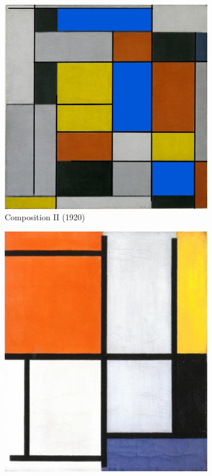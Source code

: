 \documentclass[serif,article,noparskip]{agse-thesis}
\begin{document}
\begin{figure}
\centering
\begin{subfigure}{.3\textwidth}
  \centering
  \includegraphics[width=\linewidth]{images/B104.jpg}
  \caption{Composition II (1920)}
  \label{fig:sub1}
\end{subfigure}%
\begin{subfigure}{.3\textwidth}
  \centering
  \includegraphics[width=\linewidth]{images/B123.jpg}

\end{subfigure}
\end{figure}
\end{document}
